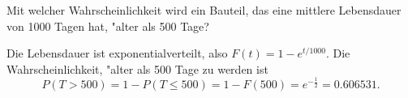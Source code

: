 Mit welcher Wahrscheinlichkeit wird ein Bauteil, das eine mittlere Lebensdauer
von 1000 Tagen hat, "alter als 500 Tage?

\begin{loesung}
Die Lebensdauer ist exponentialverteilt, also
$F(t)=1-e^{t/1000}$. Die Wahrscheinlichkeit, "alter als 500 Tage
zu werden ist
\[
P(T > 500)=1-P(T\le 500)=1-F(500)=e^{-\frac12}=0.606531.
\]
\end{loesung}

